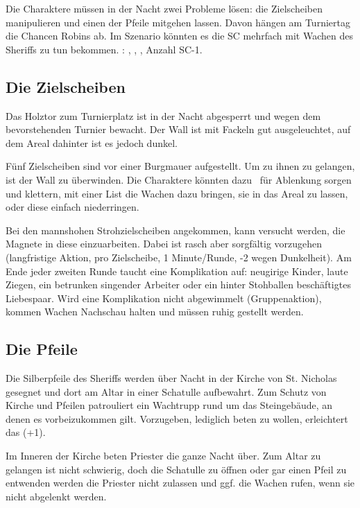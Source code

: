 {	

		\noindent
		Die Charaktere müssen in der Nacht zwei Probleme lösen: die Zielscheiben manipulieren und einen der Pfeile mitgehen lassen. Davon hängen am Turniertag die Chancen Robins ab. Im Szenario könnten es die SC mehrfach mit Wachen des Sheriffs zu tun bekommen. : , , , Anzahl SC-1.

		\subsection{Die Zielscheiben}

		Das Holztor zum Turnierplatz ist in der Nacht abgesperrt und wegen dem bevorstehenden Turnier bewacht. Der Wall ist mit Fackeln gut ausgeleuchtet, auf dem Areal dahinter ist es jedoch dunkel.

		Fünf Zielscheiben sind vor einer Burgmauer aufgestellt. Um zu ihnen zu gelangen, ist der Wall zu überwinden. Die Charaktere könnten dazu \zB~für Ablenkung sorgen und klettern, mit einer List die Wachen dazu bringen, sie in das Areal zu lassen, oder diese einfach niederringen.

		Bei den mannshohen Strohzielscheiben angekommen, kann versucht werden, die Magnete in diese einzuarbeiten. Dabei ist rasch aber sorgfältig vorzugehen (langfristige Aktion,  pro Zielscheibe, 1 Minute/Runde, -2 wegen Dunkelheit). Am Ende jeder zweiten Runde taucht eine Komplikation auf: neugirige Kinder, laute Ziegen, ein betrunken singender Arbeiter oder ein hinter Stohballen beschäftigtes Liebespaar. Wird eine Komplikation nicht abgewimmelt (Gruppenaktion), kommen Wachen Nachschau halten und müssen ruhig gestellt werden.

		\subsection{Die Pfeile}

		Die Silberpfeile des Sheriffs werden über Nacht in der Kirche von St. Nicholas gesegnet und dort am Altar in einer  Schatulle aufbewahrt. Zum Schutz von Kirche und Pfeilen patrouliert ein Wachtrupp rund um das Steingebäude, an denen es vorbeizukommen gilt. Vorzugeben, lediglich beten zu wollen, erleichtert das (+1).

		Im Inneren der Kirche beten Priester die ganze Nacht über. Zum Altar zu gelangen ist nicht schwierig, doch die Schatulle zu öffnen oder gar einen Pfeil zu entwenden werden die Priester nicht zulassen und ggf. die Wachen rufen, wenn sie nicht abgelenkt werden.

}
